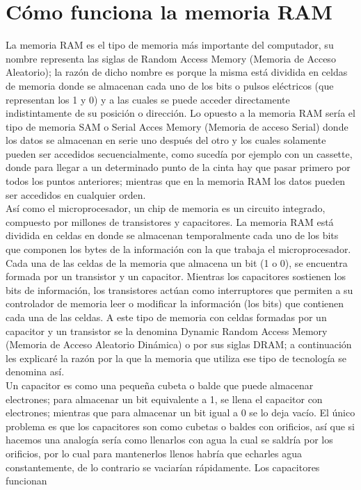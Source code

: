 \documentclass{article}
\begin{document}
\section*{Cómo funciona la memoria RAM}
La memoria RAM es el tipo de memoria más importante del computador, su nombre representa
las siglas de Random Access Memory (Memoria de Acceso Aleatorio); la razón de dicho nombre
es porque la misma está dividida en celdas de memoria donde se almacenan cada uno de los
bits o pulsos eléctricos (que representan los 1 y 0) y a las cuales se puede acceder directamente
indistintamente de su posición o dirección. Lo opuesto a la memoria RAM sería el tipo de
memoria SAM o Serial Acces Memory (Memoria de acceso Serial) donde los datos se almacenan
en serie uno después del otro y los cuales solamente pueden ser accedidos secuencialmente,
como sucedía por ejemplo con un cassette, donde para llegar a un determinado punto de la cinta
hay que pasar primero por todos los puntos anteriores; mientras que en la memoria RAM los
datos pueden ser accedidos en cualquier orden.\\[0.1cm]
Así como el microprocesador, un chip de memoria es un circuito integrado, compuesto por
millones de transistores y capacitores. La memoria RAM está dividida en celdas en donde se
almacenan temporalmente cada uno de los bits que componen los bytes de la información con
la que trabaja el microprocesador. Cada una de las celdas de la memoria que almacena un bit (1
o 0), se encuentra formada por un transistor y un capacitor. Mientras los capacitores sostienen
los bits de información, los transistores actúan como interruptores que permiten a su
controlador de memoria leer o modificar la información (los bits) que contienen cada una de
las celdas. A este tipo de memoria con celdas formadas por un capacitor y un transistor se la
denomina Dynamic Random Access Memory (Memoria de Acceso Aleatorio Dinámica) o por sus
siglas DRAM; a continuación les explicaré la razón por la que la memoria que utiliza ese tipo de
tecnología se denomina así.\\[0.1cm]
Un capacitor es como una pequeña cubeta o balde que puede almacenar electrones; para
almacenar un bit equivalente a 1, se llena el capacitor con electrones; mientras que para
almacenar un bit igual a 0 se lo deja vacío. El único problema es que los capacitores son como
cubetas o baldes con orificios, así que si hacemos una analogía sería como llenarlos con agua la
cual se saldría por los orificios, por lo cual para mantenerlos llenos habría que echarles agua
constantemente, de lo contrario se vaciarían rápidamente. Los capacitores funcionan
\end{document}
